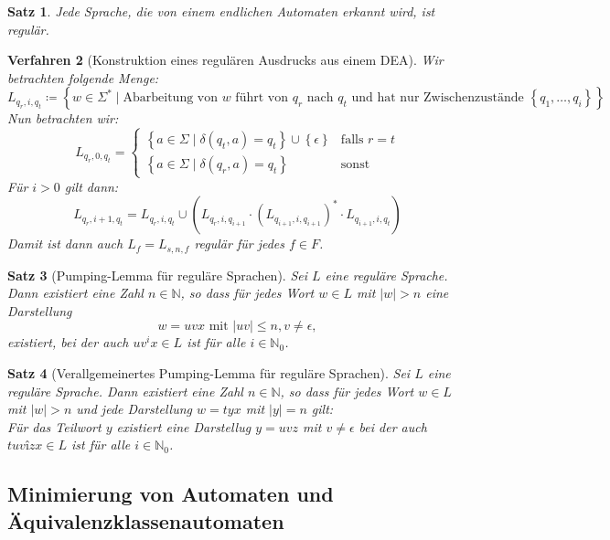\documentclass[11pt]{article}
\newcommand{\set}[1]{\left\lbrace #1\right\rbrace}
\theoremstyle{break}
\newtheorem{satz}{Satz}[section]
\newtheorem{verf}[satz]{Verfahren}
\begin{document}
    \begin{satz}
        Jede Sprache, die von einem endlichen Automaten erkannt wird, ist regulär.
    \end{satz}

    \begin{verf}[Konstruktion eines regulären Ausdrucks aus einem DEA]
        Wir betrachten folgende Menge:
        \[L_{q_r,i,q_t}\coloneqq\set{w\in\Sigma^*\mid\text{Abarbeitung von }w\text{ führt von }q_r\text{ nach }q_t\text{ und hat nur Zwischenzustände }\set{q_1,\dots ,q_i}}\]
        Nun betrachten wir:
        \[L_{q_r,0,q_t}=
        \begin{cases}
            \set{a\in\Sigma\mid\delta (q_t,a)=q_t}\cup\set{\epsilon} & \text{falls } r=t\\
            \set{a\in\Sigma\mid\delta (q_r,a)=q_t} & \text{sonst}
        \end{cases}\]
        Für $i>0$ gilt dann:
        \[L_{q_r,i+1,q_t}=L_{q_r,i,q_t}\cup (L_{q_r,i,q_{i+1}}\cdot (L_{q_{i+1},i,q_{i+1}})^*\cdot L_{q_{i+1},i,q_t})\]
        Damit ist dann auch $L_f=L_{s,n,f}$ regulär für jedes $f\in F$.
    \end{verf}

    \begin{satz}[Pumping-Lemma für reguläre Sprachen]
        Sei $L$ eine reguläre Sprache.
        Dann existiert eine Zahl $n\in\mathbb{N}$, so dass für jedes Wort $w\in L$ mit $|w|>n$ eine Darstellung
        \[w=uvx \text{ mit } |uv|\leq n, v\neq\epsilon,\]
        existiert, bei der auch $uv^{i}x\in L$ ist für alle $i\in\mathbb{N}_0$.
    \end{satz}

    \begin{satz}[Verallgemeinertes Pumping-Lemma für reguläre Sprachen]
        Sei $L$ eine reguläre Sprache.
        Dann existiert eine Zahl $n\in\mathbb{N}$, so dass für jedes Wort $w\in L$ mit $|w|>n$ und jede Darstellung $w=tyx$ mit $|y|=n$ gilt:\\
        Für das Teilwort $y$ existiert eine Darstellug $y=uvz$ mit $v\neq\epsilon$ bei der auch $tuvîzx\in L$ ist für alle $i\in\mathbb{N}_0$.
    \end{satz}


    \subsection{Minimierung von Automaten und Äquivalenzklassenautomaten}
	\label{subsec:minimierung-von-automatenindexund-äquivalenzklassenautomatenindex}
\end{document}

